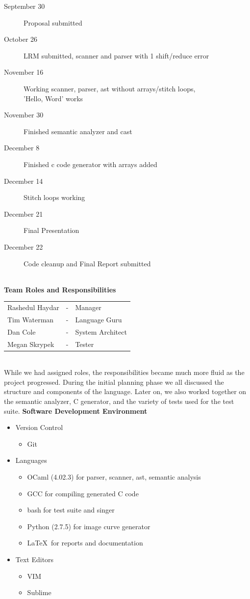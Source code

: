 \documentclass[11pt, oneside]{article}   	%
\newcommand{\tab} {\hspace*{2em}}
\begin{document}
\normalsize
\tab\begin{description}
  \item[September 30] Proposal submitted
  \item[October 26] LRM submitted, scanner and parser with 1 shift/reduce error
  \item[November 16] Working scanner, parser, ast without arrays/stitch loops, \\[.5em]'Hello, Word' works
  \item[November 30] Finished semantic analyzer and cast
  \item[December 8] Finished c code generator with arrays added
  \item[December 14] Stitch loops working 
  \item[December 21] Final Presentation
  \item[December 22] Code cleanup and Final Report submitted 
\end{description}
\tab\\[3em]
\Large\textbf{Team Roles and Responsibilities}\\[1em]
\normalsize
\tab\begin{tabular}{l c l}
Rashedul Haydar & - & Manager\\
Tim Waterman & - & Language Guru\\
Dan Cole & - & System Architect\\
Megan Skrypek & - & Tester\\
\end{tabular}\\

While we had assigned roles, the responsibilities became much more fluid as the project progressed. During the initial planning phase we all discussed the structure and components of the language. Later on, we also worked together on the semantic analyzer, C generator, and the variety of tests used for the test suite.
\newpage
\Large\textbf{Software Development Environment}\\[1em]
\normalsize
\begin{itemize}
  \item Version Control
  \begin{itemize}
    \item Git
  \end{itemize}
  \item Languages
  \begin{itemize}
    \item OCaml (4.02.3) for parser, scanner, ast, semantic analysis
    \item GCC for compiling generated C code
    \item bash for test suite and singer
    \item Python (2.7.5) for image curve generator
    \item \LaTeX\ for reports and documentation
  \end{itemize}
  \item Text Editors 
    \begin{itemize}
    \item VIM
    \item Sublime
    \end{itemize}
\end{itemize}
\end{document}
